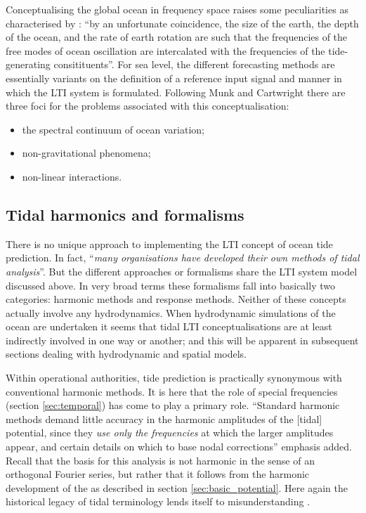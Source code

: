 Conceptualising the global ocean in frequency space raises some peculiarities as characterised by  \citet{Groves:1975ky}: ``by an unfortunate coincidence, the size of the earth, the depth of the ocean, and the rate of earth rotation are such that the frequencies of the free modes of ocean oscillation are intercalated with the frequencies of the tide-generating consitituents''.
For sea level, the different forecasting methods are essentially variants on the  definition of a reference input signal and manner in which the LTI system is formulated.   Following Munk and Cartwright \citep{Munk:1966ts} there are three foci for the problems associated with this conceptualisation:
\begin{itemize}
\item the spectral continuum of ocean variation;
\item non-gravitational phenomena; 
\item non-linear interactions.   
\end{itemize}

\subsection{Tidal harmonics and formalisms}
\label{sec:formalisms}
There is no unique approach to implementing the LTI concept of ocean tide prediction. In fact, ``\textit{many organisations have developed their own methods of tidal analysis}''\citep{IOC:2005tj}. But the different approaches or formalisms share the LTI system model discussed above.  
In very broad terms these formalisms fall into basically two categories: harmonic methods and response methods.  
Neither of these concepts actually involve any hydrodynamics. When hydrodynamic simulations of the ocean are undertaken it seems that tidal LTI conceptualisations are at least indirectly involved in one way or another; and this will be apparent in subsequent sections dealing with hydrodynamic and spatial models. 

Within operational authorities, tide prediction is practically synonymous with conventional harmonic methods. It is here that the role of special frequencies (section \ref{sec:temporal}) has come to play a primary role.
``Standard harmonic methods demand little accuracy in the harmonic amplitudes of the [tidal] potential, since they \textit{use only the frequencies} at which the larger amplitudes appear, and certain details on which to base nodal corrections''\citep{Cartwright:1973em} emphasis added.
Recall that the basis for this analysis is not harmonic in the sense of an orthogonal Fourier series, but rather that it follows from the harmonic development of the \ATGP{} as described in section \ref{sec:basic_potential}.    Here again the historical legacy of tidal terminology lends itself to misunderstanding \citep{Cartwright:2000tt,Parker:2007wq}.


